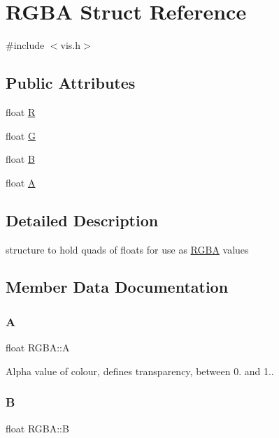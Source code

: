 \hypertarget{struct_r_g_b_a}{}\section{R\+G\+BA Struct Reference}
\label{struct_r_g_b_a}


{\ttfamily \#include $<$vis.\+h$>$}

\subsection*{Public Attributes}
\begin{DoxyCompactItemize}
\item 
float \mbox{\hyperlink{struct_r_g_b_a_ac86edc3c85a79bd5cc355d5650cb5a39}{R}}
\item 
float \mbox{\hyperlink{struct_r_g_b_a_a54b5e1344513e48c93ad662133ac0051}{G}}
\item 
float \mbox{\hyperlink{struct_r_g_b_a_ae475b21f687a620601047100d17d2f42}{B}}
\item 
float \mbox{\hyperlink{struct_r_g_b_a_a5dfd3fb3887064723e85f7bad979ff29}{A}}
\end{DoxyCompactItemize}


\subsection{Detailed Description}
structure to hold quads of floats for use as \mbox{\hyperlink{struct_r_g_b_a}{R\+G\+BA}} values 

\subsection{Member Data Documentation}
\mbox{\label{struct_r_g_b_a_a5dfd3fb3887064723e85f7bad979ff29}} 
\subsubsection{\texorpdfstring{A}{A}}
{\footnotesize\ttfamily float R\+G\+B\+A\+::A}

Alpha value of colour, defines transparency, between 0. and 1.. \mbox{\label{struct_r_g_b_a_ae475b21f687a620601047100d17d2f42}} 
\subsubsection{\texorpdfstring{B}{B}}
{\footnotesize\ttfamily float R\+G\+B\+A\+::B}

